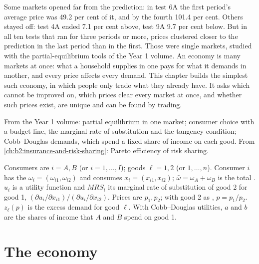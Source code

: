 Some markets opened far from the prediction: in test 6A the first period's average price was 49.2 per
cent of it, and by the fourth 101.4 per cent. Others stayed off: test 4A ended 7.1 per cent above, test
9A 9.7 per cent below. But in all ten tests that ran for three periods or more, prices clustered closer to
the prediction in the last period than in the first. Those were single markets, studied with the
partial-equilibrium tools of the Year 1 volume. An economy is many markets at once: what a household
supplies in one pays for what it demands in another, and every price affects every demand. This chapter
builds the simplest such economy, in which people only trade what they already have. It asks which
 cannot be improved on, which prices clear every market at once, and whether such prices
exist, are unique and can be found by trading.

\begin{recall}
From the Year 1 volume: partial equilibrium in one market; consumer choice with a budget line, the
marginal rate of substitution and the tangency condition; Cobb--Douglas demands, which spend a fixed
share of income on each good. From \cref{ch:b2:insurance-and-risk-sharing}: Pareto efficiency of risk
sharing.
\end{recall}

\begin{notation}\label{not:b2:exchange-economies:symbols}
Consumers are $i = A, B$ (or $i = 1, \dots, I$); goods $\ell = 1, 2$ (or $1, \dots, n$). Consumer $i$ has
the  $\omega_i = (\omega_{i1}, \omega_{i2})$ and consumes $x_i = (x_{i1}, x_{i2})$; $\bar\omega
= \omega_A + \omega_B$ is the total . $u_i$ is a utility function and $\mathit{MRS}_i$ its
marginal rate of substitution of good 2 for good 1, $(\partial u_i/\partial x_{i1})/(\partial
u_i/\partial x_{i2})$. Prices are $p_1, p_2$; with good 2 as , $p = p_1/p_2$. $z_\ell(p)$ is the
excess demand for good $\ell$. With Cobb--Douglas utilities, $a$ and $b$ are the shares of income that
$A$ and $B$ spend on good 1.
\end{notation}

\section{The economy}\label{sec:b2:exchange-economies:economy}

